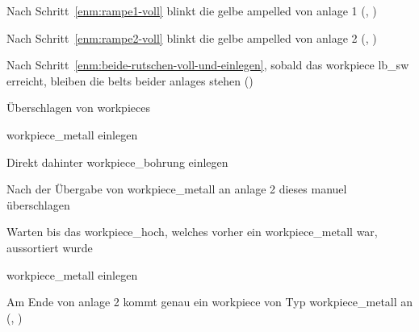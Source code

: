     \begin{erwartung}
        \item Nach Schritt~\ref{enm:rampe1-voll} blinkt die gelbe \gls{ampelled}
        von \gls{anlage} 1 (, ) %
        \item Nach Schritt~\ref{enm:rampe2-voll} blinkt die gelbe \gls{ampelled}
        von \gls{anlage} 2 (, ) %
        \item Nach Schritt~\ref{enm:beide-rutschen-voll-und-einlegen}, sobald das \gls{workpiece}
        \gls{lb_sw} erreicht, bleiben die \glspl{belt} beider \glspl{anlage} stehen ()
    \end{erwartung}

    \begin{ablauf}{Überschlagen von \glspl{workpiece}}
        \item \gls{workpiece_metall} einlegen
        \item Direkt dahinter \gls{workpiece_bohrung} einlegen
        \item Nach der Übergabe von \gls{workpiece_metall} an \gls{anlage} 2 dieses manuel überschlagen
        \item Warten bis das \gls{workpiece_hoch}, welches vorher ein \gls{workpiece_metall} war,
        aussortiert wurde
        \item \gls{workpiece_metall} einlegen
    \end{ablauf}

    \erwartungText
    Am Ende von \gls{anlage} 2 kommt genau ein \gls{workpiece} von Typ \gls{workpiece_metall} an (, )
